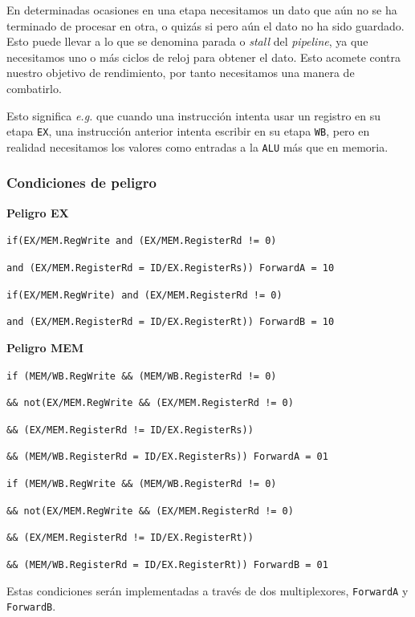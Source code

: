 \documentclass[a4paper]{article}
\begin{document}
En determinadas ocasiones en una etapa necesitamos un dato que aún no se ha terminado de procesar en otra, o quizás si pero aún el dato no ha sido guardado. Esto puede llevar a lo que se denomina parada o \textit{stall} del \textit{pipeline}, ya que necesitamos uno o más ciclos de reloj para obtener el dato. Esto acomete contra nuestro objetivo de rendimiento, por tanto necesitamos una manera de combatirlo.

Esto significa \textit{e.g.} que cuando una instrucción intenta usar un registro en su etapa \texttt{EX}, una instrucción anterior intenta escribir en su etapa \texttt{WB}, pero en realidad necesitamos los valores como entradas a la \texttt{ALU} más que en memoria.

\subsubsection{Condiciones de peligro}

\textbf{Peligro EX}

\texttt{if(EX/MEM.RegWrite and (EX/MEM.RegisterRd != 0)}

\texttt{and (EX/MEM.RegisterRd = ID/EX.RegisterRs)) ForwardA = 10}

\texttt{if(EX/MEM.RegWrite) and (EX/MEM.RegisterRd != 0)}

\texttt{and (EX/MEM.RegisterRd = ID/EX.RegisterRt)) ForwardB = 10}

\medskip

\textbf{Peligro MEM}

\texttt{if (MEM/WB.RegWrite \&\& (MEM/WB.RegisterRd !=  0)}

\texttt{\&\& not(EX/MEM.RegWrite \&\& (EX/MEM.RegisterRd != 0)}

\texttt{\&\& (EX/MEM.RegisterRd != ID/EX.RegisterRs))}

\texttt{\&\& (MEM/WB.RegisterRd = ID/EX.RegisterRs)) ForwardA = 01}

\texttt{if (MEM/WB.RegWrite \&\& (MEM/WB.RegisterRd !=  0)}

\texttt{\&\& not(EX/MEM.RegWrite \&\& (EX/MEM.RegisterRd !=  0)}

\texttt{\&\& (EX/MEM.RegisterRd !=  ID/EX.RegisterRt))}

\texttt{\&\&  (MEM/WB.RegisterRd = ID/EX.RegisterRt)) ForwardB = 01}

\bigskip

Estas condiciones serán implementadas a través de dos multiplexores, \texttt{ForwardA} y \texttt{ForwardB}.
\end{document}
